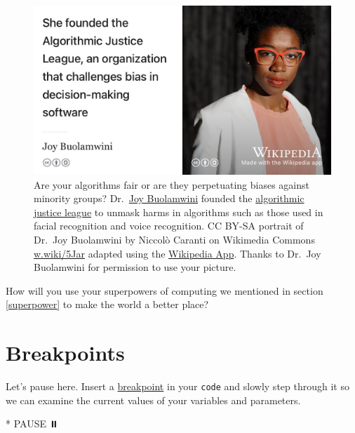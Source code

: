 \documentclass[
]{book}
\newenvironment{Shaded}{\begin{snugshade}}{\end{snugshade}}
\newcommand{\NormalTok}[1]{#1}
\newcommand{\SpecialStringTok}[1]{\textcolor[rgb]{0.31,0.60,0.02}{#1}}
\begin{document}
\begin{figure}

{\centering \includegraphics[width=1\linewidth]{images/joy-buolamwini} 

}

\caption{Are your algorithms fair or are they perpetuating biases against minority groups? Dr.~\href{https://en.wikipedia.org/wiki/Joy_Buolamwini}{Joy Buolamwini} founded the \href{https://en.wikipedia.org/wiki/Algorithmic_Justice_League}{algorithmic justice league} to unmask harms in algorithms such as those used in facial recognition and voice recognition. CC BY-SA portrait of Dr.~Joy Buolamwini by Niccolò Caranti on Wikimedia Commons \href{https://w.wiki/5Jar}{w.wiki/5Jar} adapted using the \href{https://apps.apple.com/gb/app/wikipedia/id324715238}{Wikipedia App}. Thanks to Dr.~Joy Buolamwini for permission to use your picture.}\label{fig:justice-fig}
\end{figure}



How will you use your superpowers of computing we mentioned in section \ref{superpower} to make the world a better place?

\hypertarget{bp9}{%
\section{Breakpoints}\label{bp9}}

Let's pause here. Insert a \href{https://en.wikipedia.org/wiki/Breakpoint}{breakpoint} in your \texttt{code} and slowly step through it so we can examine the current values of your variables and parameters.

\begin{Shaded}
\begin{Highlighting}[]
\SpecialStringTok{* }\NormalTok{PAUSE ⏸️}
\end{Highlighting}
\end{Shaded}
\end{document}
